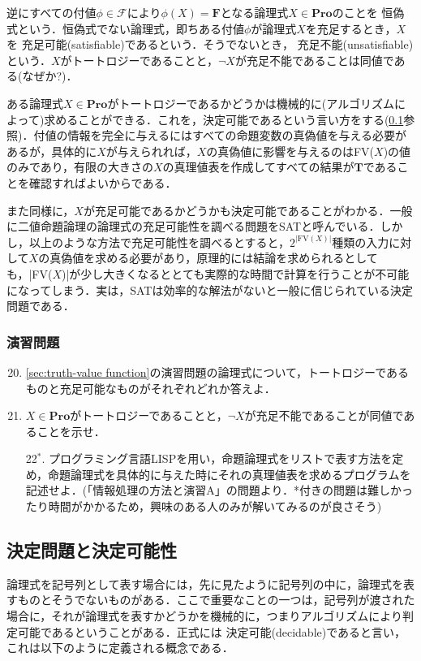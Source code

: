 \documentclass{ltjsarticle}
\theoremstyle{mystyle1}
\theoremstyle{mystyle3}
\theoremstyle{mystyle2}
\newcommand{\bT}{\ensuremath{\mathbf{T}}}
\newcommand{\bF}{\ensuremath{\mathbf{F}}}
\newcommand{\bPro}{\ensuremath{\mathbf{Pro}}}
\newcommand{\cF}{\ensuremath{\mathcal{F}}}
\newcommand{\red}[1]{{\color{red} #1}}
\begin{document}
逆にすべての付値$\phi\in\cF$により$\phi(X) = \bF$となる論理式$X\in\bPro$のことを\red{恒偽}式という．恒偽式でない論理式，即ちある付値$\phi$が論理式$X$を充足するとき，$X$を\red{充足可能}(satisfiable)であるという．そうでないとき，\red{充足不能}(unsatisfiable)という．$X$がトートロジーであることと，$\neg X$が充足不能であることは同値である(なぜか?)．

ある論理式$X\in\bPro$がトートロジーであるかどうかは機械的に(アルゴリズムによって)求めることができる．これを，決定可能であるという言い方をする(\ref{sec:decidable-and-decision problem}参照)．付値の情報を完全に与えるにはすべての命題変数の真偽値を与える必要があるが，具体的に$X$が与えられれば，$X$の真偽値に影響を与えるのはFV($X$)の値のみであり，有限の大きさの$X$の真理値表を作成してすべての結果が$\bT$であることを確認すればよいからである．

また同様に，$X$が充足可能であるかどうかも決定可能であることがわかる．一般に二値命題論理の論理式の充足可能性を調べる問題をSATと呼んでいる．しかし，以上のような方法で充足可能性を調べるとすると，$2^{|\textrm{FV}(X)|}$種類の入力に対して$X$の真偽値を求める必要があり，原理的には結論を求められるとしても，|FV($X$)|が少し大きくなるととても実際的な時間で計算を行うことが不可能になってしまう．実は，SATは効率的な解法がないと一般に信じられている決定問題である．
\subsubsection*{演習問題}
\begin{enumerate}
  \setcounter{enumi}{19}
  \item \ref{sec:truth-value function}の演習問題の論理式について，トートロジーであるものと充足可能なものがそれぞれどれか答えよ．
  \item $X\in\bPro$がトートロジーであることと，$\neg X$が充足不能であることが同値であることを示せ．
  \item[22$^\ast$.] プログラミング言語LISPを用い，命題論理式をリストで表す方法を定め，命題論理式を具体的に与えた時にそれの真理値表を求めるプログラムを記述せよ．(「情報処理の方法と演習A」の問題より．*付きの問題は難しかったり時間がかかるため，興味のある人のみが解いてみるのが良さそう)
\end{enumerate}
\subsection{決定問題と決定可能性}\label{sec:decidable-and-decision problem}
論理式を記号列として表す場合には，先に見たように記号列の中に，論理式を表すものとそうでないものがある．ここで重要なことの一つは，記号列が渡された場合に，それが論理式を表すかどうかを機械的に，つまりアルゴリズムにより判定可能であるということがある．正式には\red{決定可能}(decidable)であると言い，これは以下のように定義される概念である．
\end{document}
